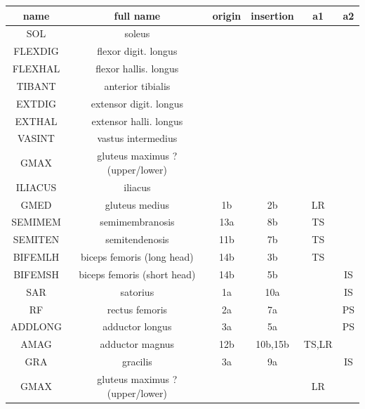\documentclass[master,english,final]{kaist-ucs}
\begin{document}
\begin{table}[h!]
\centering
  \begin{tabular}{cccccc}
  name       &  full name                      &  origin       & insertion    & a1     &  a2 \\
  \hline
  SOL        & soleus                          &               & \\
  FLEXDIG    & flexor digit. longus            &               & \\
  FLEXHAL    & flexor hallis. longus           &               & \\
  TIBANT     & anterior tibialis               &               & \\
  EXTDIG     & extensor digit. longus          &               & \\
  EXTHAL     & extensor halli. longus          &               & \\
  VASINT     & vastus intermedius              &               & \\
  GMAX       & gluteus maximus ? (upper/lower) &               & \\
  ILIACUS    & iliacus                         &               & \\
  GMED       & gluteus medius                  &  1b           & 2b           & LR \\
  SEMIMEM    & semimembranosis                 &  13a          & 8b           & TS \\
  SEMITEN    & semitendenosis                  &  11b          & 7b           & TS \\
  BIFEMLH    & biceps femoris (long head)      &  14b          & 3b           & TS \\
  BIFEMSH    & biceps femoris (short head)     &  14b          & 5b           &        & IS\\
  SAR        & satorius                        &  1a           & 10a          &        & IS\\
  RF         & rectus femoris                  &  2a           & 7a           &        & PS\\
  ADDLONG    & adductor longus                 &  3a           & 5a           &        & PS\\
  AMAG       & adductor magnus                 &  12b          & 10b,15b      & TS,LR\\
  GRA        & gracilis                        &  3a           & 9a           &        & IS\\
  GMAX       & gluteus maximus ? (upper/lower) &               &              & LR\\

\end{tabular}
\end{table}
\end{document}

